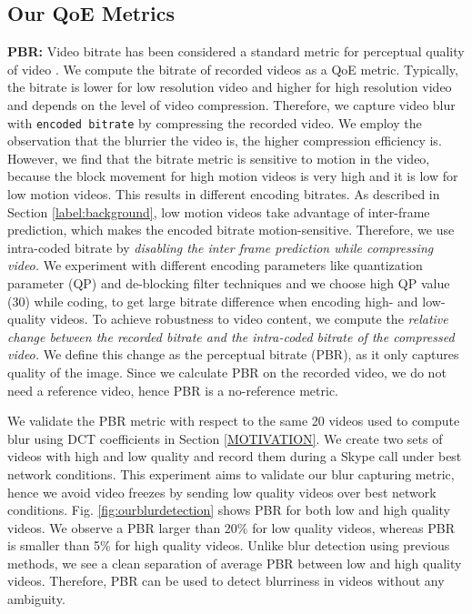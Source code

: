 \subsection{Our QoE Metrics}

\noindent \noindent \textbf{PBR:} 
Video bitrate has been considered a standard metric for perceptual quality of video \cite{zhang2012profiling, chakraborty2016exbox}.
We compute the bitrate of recorded videos as a QoE metric. Typically, the bitrate is lower for low resolution video and higher for high resolution video and depends on the level of video compression.
Therefore, we capture video blur with \texttt{encoded bitrate} by compressing the recorded video. 
We employ the observation that the blurrier the video is, the higher compression efficiency is. 
However, we find that the bitrate metric is sensitive to motion in the video, because the block movement for high motion videos is very high and it is low for low motion videos. This results in different encoding bitrates. 
As described in Section \ref{label:background}, low motion videos take advantage of inter-frame prediction, which makes the encoded bitrate motion-sensitive. 
Therefore, we use intra-coded bitrate by \emph{disabling the inter frame prediction while compressing video.}
We experiment with different encoding parameters like quantization parameter (QP) and de-blocking filter techniques and we choose high QP value (30) while coding, to get large bitrate difference when encoding high- and low-quality videos. 
To achieve robustness to video content, we compute the \emph{relative change between the recorded bitrate and  the intra-coded bitrate of the compressed video.} We define this change as the perceptual bitrate (PBR), as it only captures quality of the image. Since we calculate PBR on the recorded video, we do not need a reference video, hence PBR is a no-reference metric.

We validate the PBR metric with respect to the same 20 videos used to compute blur using DCT coefficients in Section \ref{MOTIVATION}.
We create two sets of videos with high and low quality and record them during a Skype call under best network conditions.
This experiment aims to validate our blur capturing metric, hence we avoid video freezes by sending low quality videos over best network conditions.
Fig. \ref{fig:ourblurdetection} shows PBR for both low and high quality videos.
We observe a PBR larger than 20\% for low quality videos, whereas PBR is smaller than 5\%  for high quality videos.
Unlike blur detection using previous methods, we see a clean separation of average PBR between low and high quality videos. Therefore, PBR can be used to detect blurriness in videos without any ambiguity.

